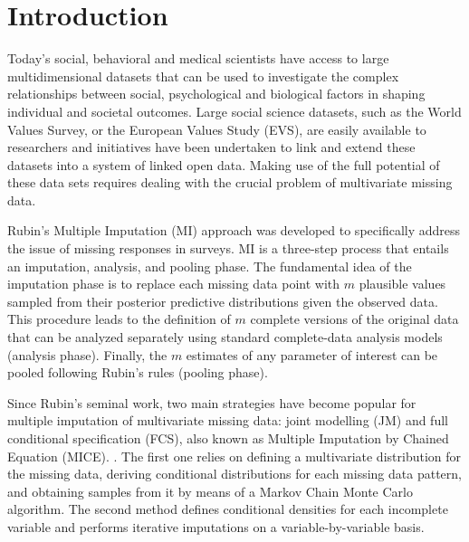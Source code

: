 \section{Introduction}


Today’s social, behavioral and medical scientists have access to large multidimensional datasets that can be
used to investigate the complex relationships between social, psychological and biological factors in 
shaping individual and societal outcomes.
Large social science datasets, such as the World Values Survey, or the European Values Study (EVS), 
are easily available to researchers and initiatives have been undertaken to link and extend these datasets 
into a system of linked open data.
Making use of the full potential of these data sets requires dealing with the crucial problem of multivariate
missing data.

Rubin's Multiple Imputation (MI) approach \citep{rubin:1987} was developed to specifically address the issue of missing 
responses in surveys.
MI is a three-step process that entails an imputation, analysis, and pooling phase.
The fundamental idea of the imputation phase is to replace each missing data point with $m$ plausible values sampled from 
their posterior predictive distributions given the observed data.
This procedure leads to the definition of $m$ complete versions of the original data that can be analyzed separately 
using standard complete-data analysis models (analysis phase).
Finally, the $m$ estimates of any parameter of interest can be pooled following Rubin's rules \citep{rubin:1987} 
(pooling phase).

Since Rubin's seminal work, two main strategies have become popular for multiple imputation of multivariate 
missing data: joint modelling (JM) \citep[ch. 4]{schafer:1997} and full conditional specification (FCS), also known 
as Multiple Imputation by Chained Equation (MICE).
\citep{vanBuurenEtAl:2006}.
The first one relies on defining a multivariate distribution for the missing data, deriving conditional
distributions for each missing data pattern, and obtaining samples from it by means of a Markov Chain Monte Carlo 
algorithm.
The second method defines conditional densities for each incomplete variable and performs iterative imputations on 
a variable-by-variable basis.

